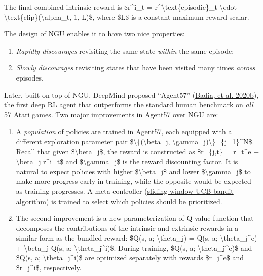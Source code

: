 The final combined intrinsic reward is \$r\^{}i\_t = r\^{}\textbackslash text\{episodic\}\_t \textbackslash cdot \textbackslash text\{clip\}(\textbackslash alpha\_t, 1, L)\$, where \$L\$ is a constant maximum reward scalar.

The design of NGU enables it to have two nice properties:

\begin{enumerate}
\tightlist
\item
  \emph{Rapidly discourages} revisiting the same state \emph{within} the same episode;
\item
  \emph{Slowly discourages} revisiting states that have been visited many times \emph{across} episodes.
\end{enumerate}

Later, built on top of NGU, DeepMind proposed ``Agent57'' (\href{https://arxiv.org/abs/2003.13350}{Badia, et al. 2020b}), the first deep RL agent that outperforms the standard human benchmark on \emph{all} 57 Atari games. Two major improvements in Agent57 over NGU are:

\begin{enumerate}
\tightlist
\item
  A \emph{population} of policies are trained in Agent57, each equipped with a different exploration parameter pair \$\textbackslash\{(\textbackslash beta\_j, \textbackslash gamma\_j)\textbackslash\}\_\{j=1\}\^{}N\$. Recall that given \$\textbackslash beta\_j\$, the reward is constructed as \$r\_\{j,t\} = r\_t\^{}e + \textbackslash beta\_j r\^{}i\_t\$ and \$\textbackslash gamma\_j\$ is the reward discounting factor. It is natural to expect policies with higher \$\textbackslash beta\_j\$ and lower \$\textbackslash gamma\_j\$ to make more progress early in training, while the opposite would be expected as training progresses. A meta-controller (\href{https://arxiv.org/pdf/0805.3415.pdf}{sliding-window UCB bandit algorithm}) is trained to select which policies should be prioritized.
\item
  The second improvement is a new parameterization of Q-value function that decomposes the contributions of the intrinsic and extrinsic rewards in a similar form as the bundled reward: \$Q(s, a; \textbackslash theta\_j) = Q(s, a; \textbackslash theta\_j\^{}e) + \textbackslash beta\_j Q(s, a; \textbackslash theta\_j\^{}i)\$. During training, \$Q(s, a; \textbackslash theta\_j\^{}e)\$ and \$Q(s, a; \textbackslash theta\_j\^{}i)\$ are optimized separately with rewards \$r\_j\^{}e\$ and \$r\_j\^{}i\$, respectively.
\end{enumerate}

